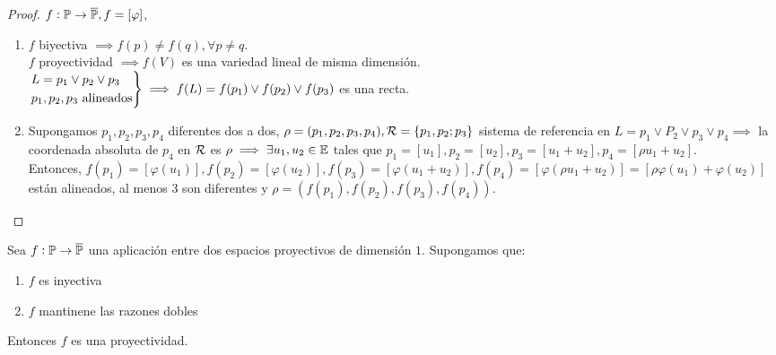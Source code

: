 \begin{proof}
    $f : \mathbb{P} \to \overline{\mathbb{P}}, f = [\varphi]$,
    \begin{enumerate}[(1)]
        \item $f$ biyectiva $\implies f(p) \neq f(q), \forall p \neq q$. \\
        $f$ proyectividad $\implies f(V)$ es una variedad lineal de misma dimensión. \\
        $\begin{rcases}
        L = p_1 \vee p_2 \vee p_3 \\
        p_1, p_2, p_3 \text{ alineados}
        \end{rcases}
        \implies f(L) = f(p_1) \vee f(p_2) \vee f(p_3)$ es una recta.
        \item Supongamos $p_1, p_2, p_3, p_4$ diferentes dos a dos, $\rho = (p_1, p_2, p_3, p_4), \mathcal{R} = \{p_1, p_2; p_3\}$ sistema de referencia en $L = p_1 \vee P_2 \vee p_3 \vee p_4 \implies$ la coordenada absoluta de $p_4$ en $\mathcal{R}$ es $\rho \implies \exists u_1, u_2 \in \mathbb{E}$ tales que $p_1 = [u_1], p_2 = [u_2], p_3 = [u_1 + u_2], p_4 = [\rho u_1 + u_2]$. \\
        Entonces, $f(p_1) = [\varphi(u_1)], f(p_2) = [\varphi(u_2)], f(p_3) = [\varphi(u_1 + u_2)], f(p_4) = [\varphi(\rho u_1 + u_2)] = [\rho \varphi(u_1) + \varphi(u_2)]$ están alineados, al menos 3 son diferentes y $\rho = (f(p_1), f(p_2), f(p_3), f(p_4))$.
    \end{enumerate}
\end{proof}

\begin{teo*} \label{teo:proy_dim_1}
    Sea $f : \mathbb{P} \to \overline{\mathbb{P}}$ una aplicación entre dos espacios proyectivos
    de dimensión $1$.
    Supongamos que:
    \begin{enumerate}
        \item $f$ es inyectiva
        \item $f$ mantinene las razones dobles
    \end{enumerate}
    Entonces $f$ es una proyectividad.
\end{teo*}

